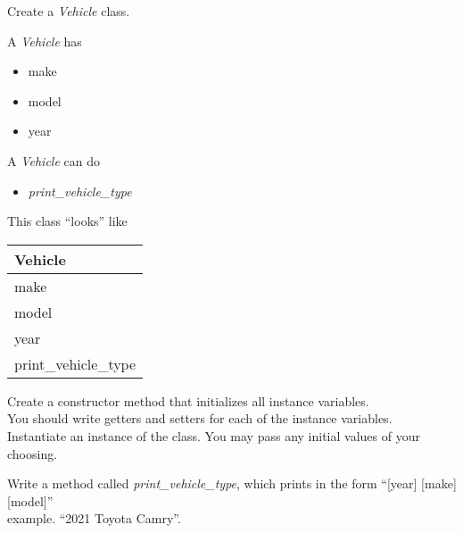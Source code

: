




	\item Create a \textit{Vehicle} class.\\
	\begin{minipage}{.6\textwidth}	
		A \textit{Vehicle} has
		\begin{itemize}
			\item make 
			\item model
			\item year	
		\end{itemize}
		
		A \textit{Vehicle} can do
		\begin{itemize}
			\item \textit{print\_vehicle\_type}
		\end{itemize}
	\end{minipage}
	\begin{minipage}{.4\textwidth}
		This class ``looks'' like 
				
		\vspace*{1em}
		\begin{tabular}{|l|}
			\hline Vehicle\\ \hline
			make\\ model\\ year\\ \hline
			print\_vehicle\_type \\  \hline
		\end{tabular}
	\end{minipage}

	\vspace*{2ex}
	Create a constructor method that initializes all instance variables.\\
	You should write getters and setters for each of the instance variables.\\
	Instantiate an instance of the class. You may pass any initial values of your choosing.

	Write a method called \textit{print\_vehicle\_type}, which prints in the form ``[year] [make] [model]''\\
	example. ``2021 Toyota Camry''.\\



